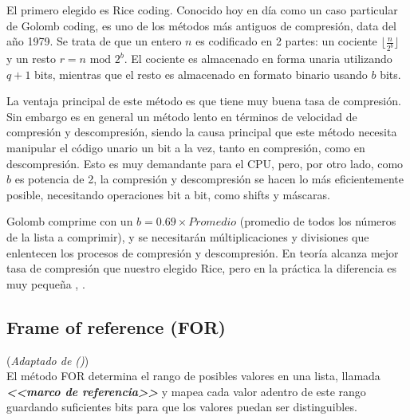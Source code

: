 El primero elegido es Rice coding. Conocido hoy en día como un caso particular de Golomb coding, es uno de los métodos más antiguos de compresión, data del año 1979. Se trata de que un entero $n$ es codificado en 2 partes: un cociente $\lfloor \frac{n}{2^b} \rfloor$ y un resto 
$r = n \text{ mod } 2^b$. El cociente es almacenado en forma unaria utilizando $q+1$ bits, mientras que el resto es almacenado en formato binario usando $b$ bits. 



La ventaja principal de este método es que tiene muy buena tasa de compresión. Sin embargo es en general un método lento en términos de velocidad de compresión y descompresión, siendo la causa principal que este método necesita manipular el código unario un bit a la vez, tanto en compresión, como en descompresión. Esto es muy demandante para el CPU, pero, por otro lado, como $b$ es potencia de 2, la compresión y descompresión se hacen lo más eficientemente posible, necesitando operaciones bit a bit, como shifts y máscaras. 

Golomb comprime con un $b= 0.69 \times Promedio$ (promedio de todos los números de la lista a comprimir), y se necesitarán múltiplicaciones y divisiones que enlentecen los procesos de compresión y descompresión. En teoría alcanza mejor tasa de compresión que nuestro elegido Rice, pero en la práctica la diferencia es muy pequeña \cite{Zhang:2008}, \cite{Buettcher2010}.


\subsection{Frame of reference (FOR)}

(\noindent \textit{Adaptado de \citet[p.~5]{Delbru10adaptiveframe} (\citeyear{Delbru10adaptiveframe})})
\\

El método FOR determina el rango de posibles valores en una lista, llamada \textit\textbf{<<marco de referencia>>} y mapea cada valor adentro de este rango guardando suficientes bits para que los valores puedan ser distinguibles. 

